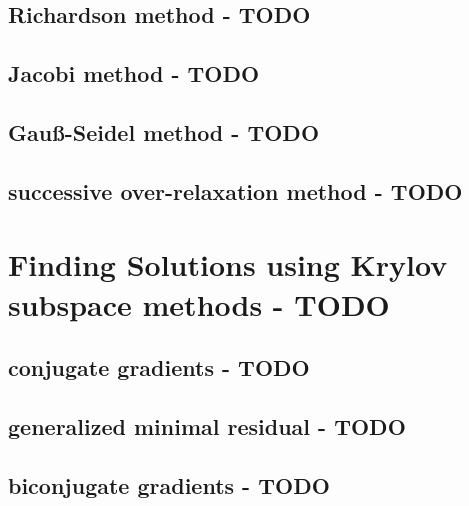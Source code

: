 \subsection{Richardson method - TODO}


\subsection{Jacobi method - TODO}


\subsection{Gauß-Seidel method - TODO}


\subsection{successive over-relaxation method - TODO}


\section{Finding Solutions using Krylov subspace methods - TODO}


\subsection{conjugate gradients - TODO}


\subsection{generalized minimal residual - TODO}


\subsection{biconjugate gradients - TODO}


















